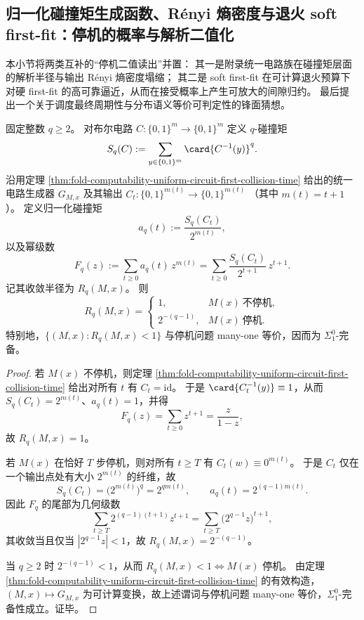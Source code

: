 \subsection{归一化碰撞矩生成函数、Rényi 熵密度与退火 soft first-fit：停机的概率与解析二值化}\label{subsec:conclusion-collision-genfunc-renyi-soft-firstfit}
本小节将两类互补的“停机二值读出”并置：
其一是附录统一电路族在碰撞矩层面的解析半径与输出 Rényi 熵密度塌缩；
其二是 soft first-fit 在可计算退火预算下对硬 first-fit 的高可靠逼近，从而在接受概率上产生可放大的间隙归约。
最后提出一个关于调度最终周期性与分布语义等价可判定性的锋面猜想。

\begin{theorem}[归一化碰撞矩生成函数的收敛半径刻画停机]\label{thm:conclusion-collision-genfunc-radius-halting}
固定整数 \(q\ge 2\)。
对布尔电路 \(C:\{0,1\}^m\to\{0,1\}^m\) 定义 \(q\)-碰撞矩
\[
S_q(C):=\sum_{y\in\{0,1\}^m}\card{C^{-1}(y)}^q.
\]
沿用定理 \ref{thm:fold-computability-uniform-circuit-first-collision-time} 给出的统一电路生成器 \(G_{M,x}\) 及其输出
\(
C_t:\{0,1\}^{m(t)}\to\{0,1\}^{m(t)}
\)
（其中 \(m(t)=t+1\)）。
定义归一化碰撞矩
\[
a_q(t):=\frac{S_q(C_t)}{2^{m(t)}},
\]
以及幂级数
\[
F_q(z):=\sum_{t\ge 0}a_q(t)\,z^{m(t)}
=\sum_{t\ge 0}\frac{S_q(C_t)}{2^{t+1}}\,z^{t+1}.
\]
记其收敛半径为 \(R_q(M,x)\)。
则
\[
R_q(M,x)=
\begin{cases}
1,&M(x)\ \text{不停机},\\[2pt]
2^{-(q-1)},&M(x)\ \text{停机}.
\end{cases}
\]
特别地，\(\{(M,x):R_q(M,x)<1\}\) 与停机问题 many-one 等价，因而为 \(\Sigma^0_1\)-完备。
\end{theorem}
\begin{proof}
若 \(M(x)\) 不停机，则定理 \ref{thm:fold-computability-uniform-circuit-first-collision-time} 给出对所有 \(t\) 有 \(C_t=\mathrm{id}\)。
于是 \(\card{C_t^{-1}(y)}\equiv 1\)，从而 \(S_q(C_t)=2^{m(t)}\)、\(a_q(t)=1\)，并得
\[
F_q(z)=\sum_{t\ge 0}z^{t+1}=\frac{z}{1-z},
\]
故 \(R_q(M,x)=1\)。

若 \(M(x)\) 在恰好 \(T\) 步停机，则对所有 \(t\ge T\) 有 \(C_t(w)\equiv 0^{m(t)}\)。
于是 \(C_t\) 仅在一个输出点处有大小 \(2^{m(t)}\) 的纤维，故
\[
S_q(C_t)=\bigl(2^{m(t)}\bigr)^q=2^{qm(t)},\qquad a_q(t)=2^{(q-1)m(t)}.
\]
因此 \(F_q\) 的尾部为几何级数
\[
\sum_{t\ge T}2^{(q-1)(t+1)}z^{t+1}
=\sum_{t\ge T}\bigl(2^{q-1}z\bigr)^{t+1},
\]
其收敛当且仅当 \(|2^{q-1}z|<1\)，故 \(R_q(M,x)=2^{-(q-1)}\)。

当 \(q\ge 2\) 时 \(2^{-(q-1)}<1\)，从而 \(R_q(M,x)<1\iff M(x)\) 停机。
由定理 \ref{thm:fold-computability-uniform-circuit-first-collision-time} 的有效构造，\((M,x)\mapsto G_{M,x}\) 为可计算变换，故上述谓词与停机问题 many-one 等价，\(\Sigma^0_1\)-完备性成立。证毕。
\end{proof}

